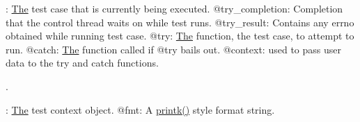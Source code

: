 \begin{DoxyRefList}
%
\+: \mbox{\hyperlink{classThe}{The}} test case that is currently being executed. @try\+\_\+completion\+: Completion that the control thread waits on while test runs. @try\+\_\+result\+: Contains any errno obtained while running test case. @try\+: \mbox{\hyperlink{classThe}{The}} function, the test case, to attempt to run. @catch\+: \mbox{\hyperlink{classThe}{The}} function called if @try bails out. @context\+: used to pass user data to the try and catch functions. 
\item[Member \mbox{\hyperlink{test_8h_a8a1d9eb494a19c8bfdff75cb22bc9f65}{kunit\+\_\+warn}} (test, fmt,...)]\label{test__test000022}%
%
.

\label{test__test000023}%
%
\+: \mbox{\hyperlink{classThe}{The}} test context object. @fmt\+: A \mbox{\hyperlink{linux_2printk_8h_ac002b290a55c356b2b46a7be61a791d4}{printk()}} style format string.
\end{DoxyRefList}